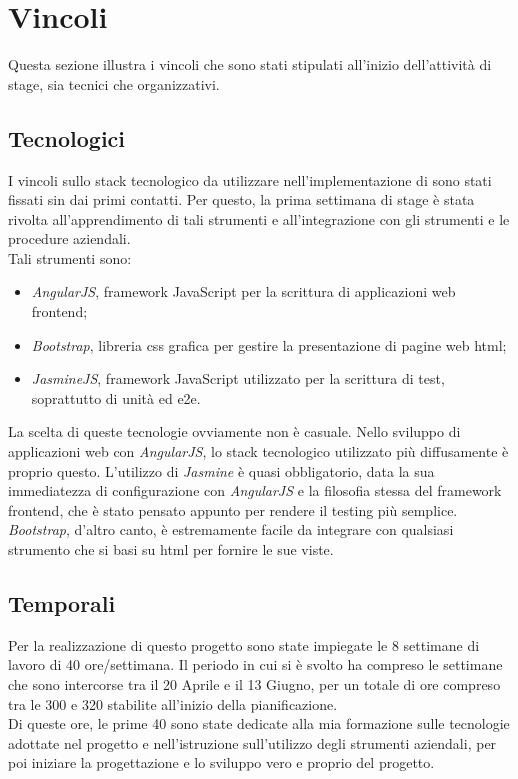 
\section{Vincoli}
Questa sezione illustra i vincoli che sono stati stipulati all'inizio dell'attività di stage, sia tecnici che organizzativi.

\subsection{Tecnologici}
I vincoli sullo stack tecnologico da utilizzare nell'implementazione di \myTitle{} sono stati fissati sin dai primi contatti. Per questo, la prima settimana di stage è stata rivolta all'apprendimento di tali strumenti e all'integrazione con gli strumenti e le procedure aziendali.\\
Tali strumenti sono:
\begin{itemize}
	\item \emph{AngularJS}, framework JavaScript per la scrittura di applicazioni web frontend;
	\item \emph{Bootstrap}, libreria \gls{css} grafica per gestire la presentazione di pagine web \gls{html};
	\item \emph{JasmineJS}, framework JavaScript utilizzato per la scrittura di test, soprattutto di unità ed \gls{e2e}. 
\end{itemize}
La scelta di queste tecnologie ovviamente non è casuale. Nello sviluppo di applicazioni web con \emph{AngularJS}, lo stack tecnologico utilizzato più diffusamente è proprio questo. L'utilizzo di \emph{Jasmine} è quasi obbligatorio, data la sua immediatezza di configurazione con \emph{AngularJS} e la filosofia stessa del framework frontend, che è stato pensato appunto per rendere il testing più semplice.\\
\emph{Bootstrap}, d'altro canto, è estremamente facile da integrare con qualsiasi strumento che si basi su \gls{html} per fornire le sue viste.

\subsection{Temporali}
Per la realizzazione di questo progetto sono state impiegate le 8 settimane di lavoro di 40 ore/settimana. Il periodo in cui si è svolto ha compreso le settimane che sono intercorse tra il 20 Aprile e il 13 Giugno, per un totale di ore compreso tra le 300 e 320 stabilite all'inizio della pianificazione.\\
Di queste ore, le prime 40 sono state dedicate alla mia formazione sulle tecnologie adottate nel progetto e nell'istruzione sull'utilizzo degli strumenti aziendali, per poi iniziare la progettazione e lo sviluppo vero e proprio del progetto.

